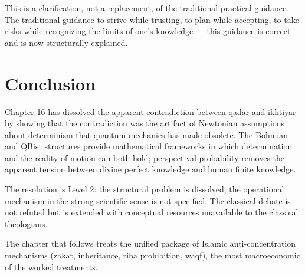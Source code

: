 This is a clarification, not a replacement, of the traditional
practical guidance. The traditional guidance to strive while
trusting, to plan while accepting, to take risks while
recognizing the limits of one's knowledge --- this guidance is
correct and is now structurally explained.

\section{Conclusion}

Chapter 16 has dissolved the apparent contradiction between qadar
and ikhtiyar by showing that the contradiction was the artifact of
Newtonian assumptions about determinism that quantum mechanics has
made obsolete. The Bohmian and QBist structures provide
mathematical frameworks in which determination and the reality of
motion can both hold; perspectival probability removes the
apparent tension between divine perfect knowledge and human
finite knowledge.

The resolution is Level 2: the structural problem is dissolved;
the operational mechanism in the strong scientific sense is not
specified. The classical  debate is not refuted but is
extended with conceptual resources unavailable to the classical
theologians.

The chapter that follows treats the unified package of Islamic
anti-concentration mechanisms (zakat, inheritance, riba
prohibition, waqf), the most macroeconomic of the worked
treatments.


